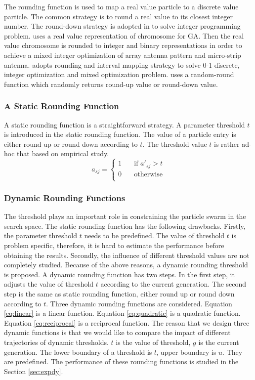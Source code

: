 The rounding function is used to map a real value particle to a discrete value particle.
The common strategy is to round a real value to its closest integer number.
The round-down strategy is adopted in \cite{1004478} to solve integer programming problem. 
\cite{4120263} uses a real value representation of chromosome for GA. 
Then the real value chromosome is rounded to integer and binary representations in order to 
achieve a mixed integer optimization of array antenna pattern and micro-strip antenna. 
\cite{liu2013discrete} adopts rounding and interval mapping strategy to solve 0-1 discrete,
integer optimization and mixed optimization problem. 
\cite{Anghinolfi200973} uses a random-round function which randomly returns round-up value or round-down value.

\subsubsection{A Static Rounding Function}

A static rounding function is a straightforward strategy. A parameter threshold $t$ is introduced in the static rounding function.
The value of a particle entry is either round up or round down according to $t$. 
The threshold value $t$ is rather ad-hoc that based on empirical study.
 \begin{equation}
 	\label{eq:1}
 	a_{sj} = 
 	\begin{cases}
 		1 & \quad \text{if } a'_{sj} > t \\
 		0 & \quad \text{otherwise} \\
 	\end{cases}
 \end{equation}

 
\subsubsection{Dynamic Rounding Functions}
\label{sec:dynamic}
The threshold plays an important role in constraining the particle swarm in the search space.
The static rounding function has the following drawbacks. Firstly, the parameter threshold $t$ needs to be predefined. 
The value of threshold $t$ is problem specific, therefore, it is hard to estimate the performance before obtaining the results.
Secondly, the influence of different threshold values are not completely studied. Because of the above reasons, a dynamic rounding threshold
is proposed. A dynamic rounding function has two steps. In the first step, it adjusts the value of threshold $t$ according to the current generation. 
The second step is the same as static rounding function, either round up or round down according to $t$. Three dynamic rounding functions are considered. Equation \ref{eq:linear} is a linear function.
Equation \ref{eq:quadratic} is a quadratic function. Equation \ref{eq:reciprocal} is a reciprocal function. The reason that we design three 
dynamic functions is that we would like to compare the impact of different trajectories of dynamic thresholds.
$t$ is the value of threshold, $g$ is the current generation. The lower boundary of a threshold is $l$, upper boundary is $u$.
They are predefined.
The performance of these rounding functions is studied in the Section \ref{sec:expdy}.

